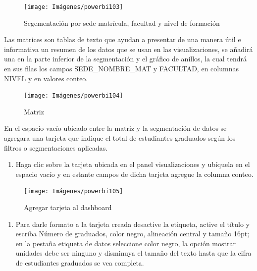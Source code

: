 \documentclass[
]{book}
\providecommand{\tightlist}{%
  \setlength{\itemsep}{0pt}\setlength{\parskip}{0pt}}
\begin{document}
\begin{figure}

{\centering \texttt{[image: Imágenes/powerbi103]} 

}

\caption{Segementación por sede matrícula, facultad y nivel de formación}\label{fig:segmentacionessedefacultadnivel-fig}
\end{figure}

Las matrices son tablas de texto que ayudan a presentar de una manera útil e informativa un resumen de los datos que se usan en las visualizaciones, se añadirá una en la parte inferior de la segmentación y el gráfico de anillos, la cual tendrá en sus filas los campos SEDE\_NOMBRE\_MAT y FACULTAD, en columnas NIVEL y en valores conteo.

\begin{figure}

{\centering \texttt{[image: Imágenes/powerbi104]} 

}

\caption{Matriz}\label{fig:matrizparanivel-fig}
\end{figure}

En el espacio vacío ubicado entre la matriz y la segmentación de datos se agregara una tarjeta que indique el total de estudiantes graduados según los filtros o segmentaciones aplicadas.

\begin{enumerate}
\def\labelenumi{\arabic{enumi}.}
\tightlist
\item
  Haga clic sobre la tarjeta ubicada en el panel visualizaciones y ubíquela en el espacio vacío y en estante campos de dicha tarjeta agregue la columna conteo.
\end{enumerate}

\begin{figure}

{\centering \texttt{[image: Imágenes/powerbi105]} 

}

\caption{Agregar tarjeta al dashboard}\label{fig:paso1tarjeta-fig}
\end{figure}

\begin{enumerate}
\def\labelenumi{\arabic{enumi}.}
\setcounter{enumi}{1}
\tightlist
\item
  Para darle formato a la tarjeta creada desactive la etiqueta, active el título y escriba Número de graduados, color negro, alineación central y tamaño 16pt; en la pestaña etiqueta de datos seleccione color negro, la opción mostrar unidades debe ser ninguno y disminuya el tamaño del texto hasta que la cifra de estudiantes graduados se vea completa.
\end{enumerate}
\end{document}
